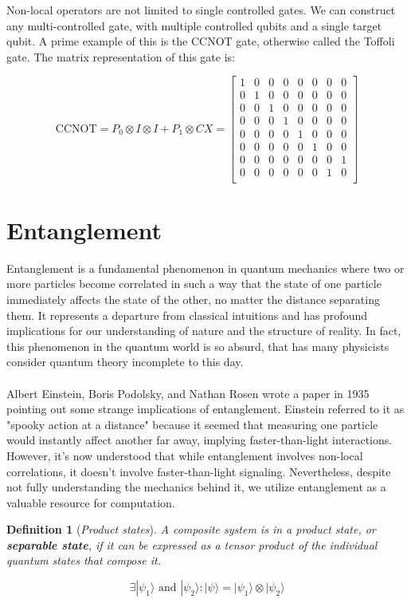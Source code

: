 \documentclass[12pt,a4paper]{report}
\newtheorem{definition}{Definition}
\begin{document}
\noindent
Non-local operators are not limited to single controlled gates. We can construct any multi-controlled gate, with multiple controlled qubits and a single target qubit. A prime example of this is the CCNOT gate, otherwise called the Toffoli gate. The matrix representation of this gate is:

\[
\text{CCNOT} = P_0 \otimes I \otimes I + P_1 \otimes CX = 
\begin{bmatrix}
1 & 0 & 0 & 0 & 0 & 0 & 0 & 0 \\
0 & 1 & 0 & 0 & 0 & 0 & 0 & 0 \\
0 & 0 & 1 & 0 & 0 & 0 & 0 & 0 \\
0 & 0 & 0 & 1 & 0 & 0 & 0 & 0 \\
0 & 0 & 0 & 0 & 1 & 0 & 0 & 0 \\
0 & 0 & 0 & 0 & 0 & 1 & 0 & 0 \\
0 & 0 & 0 & 0 & 0 & 0 & 0 & 1 \\
0 & 0 & 0 & 0 & 0 & 0 & 1 & 0 \\
\end{bmatrix}
\]

\section{Entanglement}
Entanglement is a fundamental phenomenon in quantum mechanics where two or more particles become correlated in such a way that the state of one particle immediately affects the state of the other, no matter the distance separating them. It represents a departure from classical intuitions and has profound implications for our understanding of nature and the structure of reality. In fact, this phenomenon in the quantum world is so absurd, that has many physicists consider quantum theory incomplete to this day.
\\
\\
\noindent
Albert Einstein, Boris Podolsky, and Nathan Rosen wrote a paper in 1935 pointing out some strange implications of entanglement. Einstein referred to it as "spooky action at a distance" because it seemed that measuring one particle would instantly affect another far away, implying faster-than-light interactions. However, it's now understood that while entanglement involves non-local correlations, it doesn't involve faster-than-light signaling. Nevertheless, despite not fully understanding the mechanics behind it, we utilize entanglement as a valuable resource for computation.

\begin{definition}[\emph{Product states}]
A composite system is in a product state, or \textbf{separable state}, if it can be expressed as a tensor product of the individual quantum states that compose it.

\[
\exists |\psi_1\rangle \text{ and } |\psi_2\rangle : |\psi\rangle = |\psi_1\rangle \otimes |\psi_2\rangle
\]
\end{definition}
\end{document}
